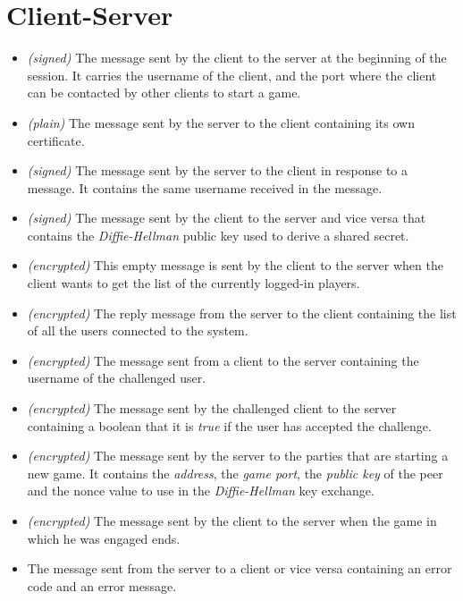 \section{Client-Server}\label{sec:servermsgs}

\begin{itemize}
	\item[]  \emph{(signed)} The message sent by the
		client to the server at the beginning of the session. It carries
		the username of the client, and the port where the client can be
		contacted by other clients to start a game.
	\item[]  \emph{(plain)} The message sent by the
		server to the client containing its own certificate.
	\item[]  \emph{(signed)} The message sent by the
		server to the client in response to a 
		message. It contains the same username received in the
		 message.
	\item[]  \emph{(signed)} The message sent by the client
		to the server and vice versa that contains the
		\emph{Diffie-Hellman} public key used to derive a shared secret.
	\item[]  \emph{(encrypted)} This empty
		message is sent by the client to the server when the client
		wants to get the list of the currently logged-in players.
	\item[]  \emph{(encrypted)} The reply message
		from the server to the client containing the list of all the
		users connected to the system.
	\item[]  \emph{(encrypted)} The message sent
		from a client to the server containing the username of the
		challenged user.
	\item[]  \emph{(encrypted)} The message sent by
		the challenged client to the server containing a boolean that it
		is \emph{true} if the user has accepted the challenge.
	\item[]  \emph{(encrypted)} The message sent by
		the server to the parties that are starting a new game. It
		contains the \emph{address}, the \emph{game port}, the
		\emph{public key} of the peer and the nonce value to use in the
		\textit{Diffie-Hellman} key exchange.
	\item[]  \emph{(encrypted)} The message sent by the
		client to the server when the game in which he was engaged ends.
	\item[]  The message sent from the server to a client or
		vice versa containing an error code and an error message.
\end{itemize}
